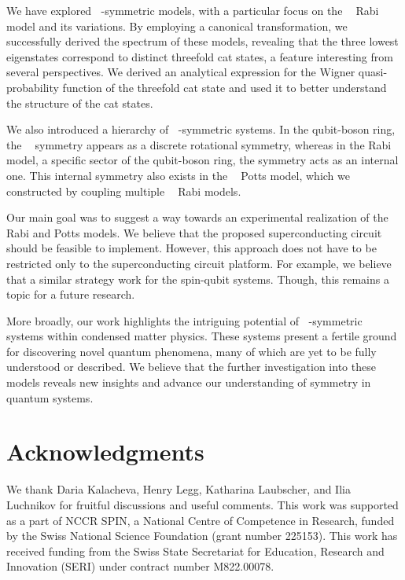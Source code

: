 \documentclass[reprint, aps, prx, amsmath, amssymb, longbibliography, superscriptaddress]{revtex4-2}
\DeclareMathOperator{\Zn}{\mathbb{Z}_n}
\DeclareMathOperator{\Zthree}{\mathbb{Z}_3}
\begin{document}
We have explored $\Zthree$-symmetric models, with a particular focus on the $\Zthree$ Rabi model and its variations. By employing a canonical transformation, we successfully derived the spectrum of these models, revealing that the three lowest eigenstates correspond to distinct threefold cat states, a feature interesting from several perspectives. We derived an analytical expression for the Wigner quasi-probability function of the threefold cat state and used it to better understand the structure of the cat states.

We also introduced a hierarchy of $\Zthree$-symmetric systems. In the qubit-boson ring, the $\Zthree$ symmetry appears as a discrete rotational symmetry, whereas in the Rabi model, a specific sector of the qubit-boson ring, the symmetry acts as an internal one. This internal symmetry also exists in the $\Zthree$ Potts model, which we constructed by coupling multiple $\Zthree$ Rabi models.

Our main goal was to suggest a way towards an experimental realization of the $\Zthree$ Rabi and Potts models. We believe that the proposed superconducting circuit should be feasible to implement. However, this approach does not have to be restricted only to the superconducting circuit platform. For example, we believe that a similar strategy work for the spin-qubit systems. Though, this remains a topic for a future research.

More broadly, our work highlights the intriguing potential of $\Zn$-symmetric systems within condensed matter physics. These systems present a fertile ground for discovering novel quantum phenomena, many of which are yet to be fully understood or described. We believe that the further investigation into these models reveals new insights and advance our understanding of symmetry in quantum systems.

\section*{Acknowledgments} 

We thank Daria Kalacheva, Henry Legg, Katharina Laubscher, and Ilia Luchnikov for fruitful discussions and useful comments. This work was supported as a part of NCCR SPIN, a National Centre of Competence in Research, funded by the Swiss National Science Foundation (grant number 225153). This work has received funding from the Swiss State Secretariat for Education, Research and Innovation (SERI) under contract number M822.00078.
\end{document}
